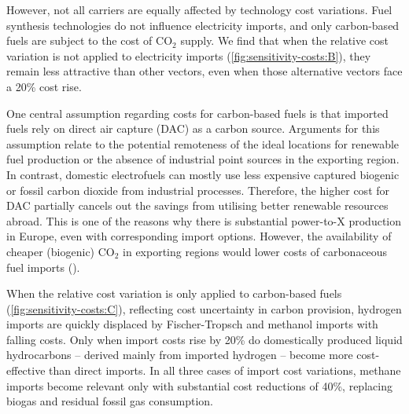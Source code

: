 However, not all carriers are equally affected by technology cost variations.
Fuel synthesis technologies do not influence electricity imports, and only
carbon-based fuels are subject to the cost of CO$_2$ supply. We find that when
the relative cost variation is not applied to electricity imports
(\cref{fig:sensitivity-costs:B}), they remain less attractive than other
vectors, even when those alternative vectors face a 20\% cost rise.

One central assumption regarding costs for carbon-based fuels is that imported
fuels rely on direct air capture (DAC) as a carbon source. Arguments for this
assumption relate to the potential remoteness of the ideal locations for
renewable fuel production or the absence of industrial point sources in the
exporting region. In contrast, domestic electrofuels can mostly use less
expensive captured biogenic or fossil carbon dioxide from industrial processes.
Therefore, the higher cost for DAC partially cancels out the savings from
utilising better renewable resources abroad. This is one of the reasons why
there is substantial power-to-X production in Europe, even with corresponding
import options. However, the availability of cheaper (biogenic) CO$_2$ in
exporting regions would lower costs of carbonaceous fuel imports
().

When the relative cost variation is only applied to carbon-based fuels
(\cref{fig:sensitivity-costs:C}), reflecting cost uncertainty in carbon
provision, hydrogen imports are quickly displaced by Fischer-Tropsch and
methanol imports with falling costs. Only when import costs rise by 20\% do
domestically produced liquid hydrocarbons -- derived mainly from imported
hydrogen -- become more cost-effective than direct imports. In all three cases
of import cost variations, methane imports become relevant only with substantial
cost reductions of 40\%, replacing biogas and residual fossil gas consumption.

